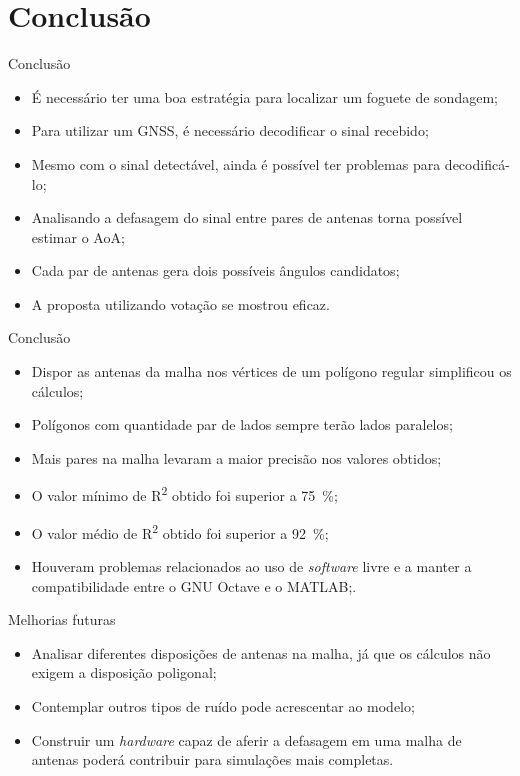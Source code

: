 \section{Conclusão}

\begin{frame}{Conclusão}
	\begin{itemize}[<+->]\addtolength{\itemsep}{0.5\baselineskip}
		\item É necessário ter uma boa estratégia para localizar um foguete de sondagem;
		\item Para utilizar um GNSS, é necessário decodificar o sinal recebido;
		\item Mesmo com o sinal detectável, ainda é possível ter problemas para decodificá-lo;
		\item Analisando a defasagem do sinal entre pares de antenas torna possível estimar o AoA;
		\item Cada par de antenas gera dois possíveis ângulos candidatos;
		\item A proposta utilizando votação se mostrou eficaz.
	\end{itemize}
\end{frame}

\begin{frame}{Conclusão}
	\begin{itemize}[<+->]\addtolength{\itemsep}{0.5\baselineskip}
		\item Dispor as antenas da malha nos vértices de um polígono regular simplificou os cálculos;
		\item Polígonos com quantidade par de lados sempre terão lados paralelos;
		\item Mais pares na malha levaram a maior precisão nos valores obtidos;
		\item O valor mínimo de R\textsuperscript{2} obtido foi superior a \qty{75}{\percent};
		\item O valor médio de R\textsuperscript{2} obtido foi superior a \qty{92}{\percent};
		\item Houveram problemas relacionados ao uso de \textit{software} livre e a manter a compatibilidade entre o GNU Octave e o MATLAB;.
	\end{itemize}
\end{frame}

\begin{frame}{Melhorias futuras}
	\begin{itemize}[<+->]\addtolength{\itemsep}{0.5\baselineskip}
		\item Analisar diferentes disposições de antenas na malha, já que os cálculos não exigem a disposição poligonal;
		\item Contemplar outros tipos de ruído pode acrescentar ao modelo;
		\item Construir um \textit{hardware} capaz de aferir a defasagem em uma malha de antenas poderá contribuir para simulações mais completas.
	\end{itemize}
\end{frame}
